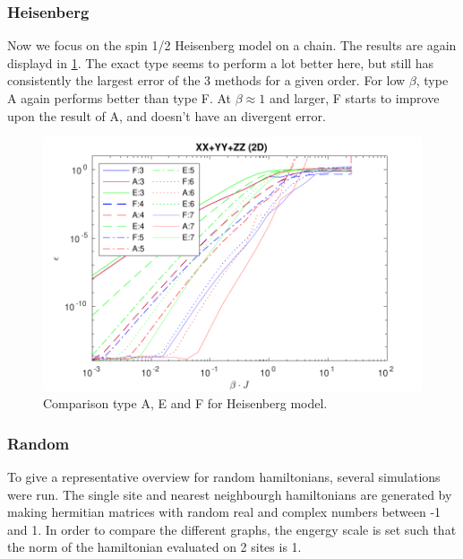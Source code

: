 \subsubsection{Heisenberg}

Now we focus on the spin 1/2 Heisenberg model on a chain. The results are again displayd in \cref{fig:benchmark:tHeisenberg}. The exact type seems to perform a lot better here, but still has consistently the largest error of the 3 methods for a given order. For low $\beta$, type A again performs better than type F. At $\beta \approx 1$ and larger, F starts to improve upon the result of A, and doesn't have an divergent error.

\begin{figure}
    \center
    \includegraphics[width=\textwidth]{Figuren/benchmarking/t_heis_XXX.pdf}
    \caption{Comparison type A, E and F for Heisenberg model.}
    \label{fig:benchmark:tHeisenberg}
\end{figure}

\subsubsection{Random}

To give a representative overview for random hamiltonians, several simulations were run. The single site and nearest neighbourgh hamiltonians are generated by making hermitian matrices with random real and complex numbers between -1 and 1. In order to compare the different graphs, the engergy scale is set such that the norm of the hamiltonian evaluated on 2 sites is 1.



